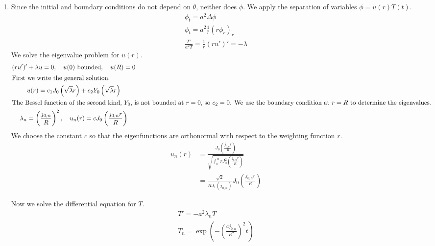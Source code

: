 {%
\begin{Solution}
  \label{solution heat polar separation}
  \begin{enumerate}
  \item
    Since the initial and boundary conditions do not depend on $\theta$,
    neither does $\phi$.  We apply the separation of variables
    $\phi = u(r) T(t)$.
    \begin{gather}
      \label{phi_t=a^2Deltaphi}
      \phi_t = a^2 \Delta \phi \\
      \phi_t = a^2 \frac{1}{r} \left( r \phi_r \right)_r \\
      \frac{ T' }{ a^2 T } = \frac{1}{r} ( r u' )' = - \lambda
    \end{gather}
    We solve the eigenvalue problem for $u(r)$.
    \begin{gather*}
      (r u')' + \lambda u = 0, \quad u(0)\ \mathrm{bounded}, 
      \quad u(R) = 0 \\
      \intertext{First we write the general solution.}
      u(r) = c_1 J_0 \left( \sqrt{\lambda} r \right) + 
      c_2 Y_0 \left( \sqrt{\lambda} r \right) \\
      \intertext{The Bessel function of the second kind, $Y_0$, is not
        bounded at $r = 0$, so $c_2 = 0$.  We use the boundary
        condition at $r = R$ to determine the eigenvalues.}
      \lambda_n = \left( \frac{ j_{0,n} }{ R } \right)^2, \quad
      u_n(r) = c J_0 \left( \frac{ j_{0,n} r }{ R } \right)
    \end{gather*}
    We choose the constant $c$ so that the eigenfunctions are orthonormal
    with respect to the weighting function $r$.
    \begin{align*}
      u_n(r) &= \frac{ J_0 \left( \frac{ j_{0,n} r }{ R } \right) }
      { \sqrt{ \int_0^R r J_0^2 \left( \frac{ j_{0,n} r }{ R }
          \right) } } \\
      &= \frac{ \sqrt{2} }{ R J_1( j_{0,n} ) }
      J_0 \left( \frac{ j_{0,n} r }{ R } \right)
    \end{align*}

    Now we solve the differential equation for $T$.
    \begin{gather*}
      T' = - a^2 \lambda_n T \\
      T_n = \exp \left( - \left( \frac{ a j_{0,n} }{ R^2 } \right)^2 t \right)
    \end{gather*}


\end{enumerate}
\end{Solution}}
